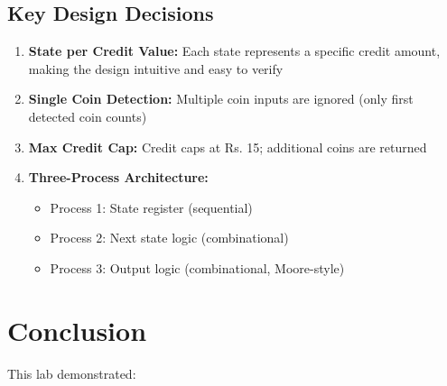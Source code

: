 \documentclass[12pt,a4paper]{article}
\begin{document}
\subsection{Key Design Decisions}

\begin{enumerate}
    \item \textbf{State per Credit Value:} Each state represents a specific credit amount, making the design intuitive and easy to verify
    \item \textbf{Single Coin Detection:} Multiple coin inputs are ignored (only first detected coin counts)
    \item \textbf{Max Credit Cap:} Credit caps at Rs. 15; additional coins are returned
    \item \textbf{Three-Process Architecture:}
    \begin{itemize}
        \item Process 1: State register (sequential)
        \item Process 2: Next state logic (combinational)
        \item Process 3: Output logic (combinational, Moore-style)
    \end{itemize}
\end{enumerate}

\newpage
\section{Conclusion}

This lab demonstrated:
\end{document}
